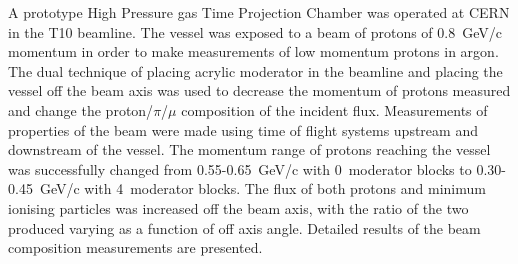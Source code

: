 A prototype High Pressure gas Time Projection Chamber was operated at CERN in the T10 beamline. The vessel was exposed to a beam of protons of 0.8~GeV/c momentum in order to make measurements of low momentum protons in argon.
The dual technique of placing acrylic moderator in the beamline and placing the vessel off the beam axis was used to decrease the momentum of protons measured and change the proton/$\pi$/$\mu$ composition of the incident flux.
Measurements of properties of the beam were made using time of flight systems upstream and downstream of the vessel. The momentum range of protons reaching the vessel was successfully changed from 0.55-0.65~GeV/c with 0~moderator blocks to 0.30-0.45~GeV/c with 4~moderator blocks.
The flux of both protons and minimum ionising particles was increased off the beam axis, with the ratio of the two produced varying as a function of off axis angle. Detailed results of the beam composition measurements are presented.

